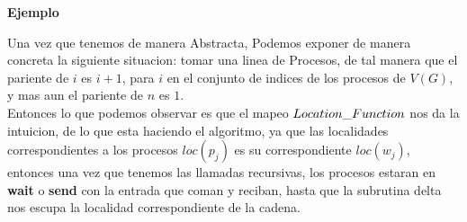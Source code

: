 \documentclass[11pt]{article}
\begin{document}
    \newpage
    \begin{center}
        \textbf{Ejemplo}
    \end{center}
    Una vez que tenemos de manera Abstracta,
    Podemos exponer de manera concreta la siguiente situacion: tomar una linea de Procesos, de tal manera que el pariente de $i$ es $i+1$, para $i$ en el
    conjunto de indices de los procesos de $V(G)$, y mas aun el pariente de $n$ es $1$.
    \\
    Entonces lo que podemos observar es que el mapeo $Location\char95 Function$ nos da la intuicion,
    de lo que esta haciendo el algoritmo, ya que las localidades correspondientes a los procesos $loc(p_{j})$ es su
    correspondiente $loc(w_{j})$, entonces una vez que tenemos las llamadas recursivas, los procesos estaran en \textbf{wait}
    o \textbf{send} con la entrada que coman y reciban, hasta que la subrutina delta nos escupa la localidad correspondiente de la cadena.
    \\
\end{document}
